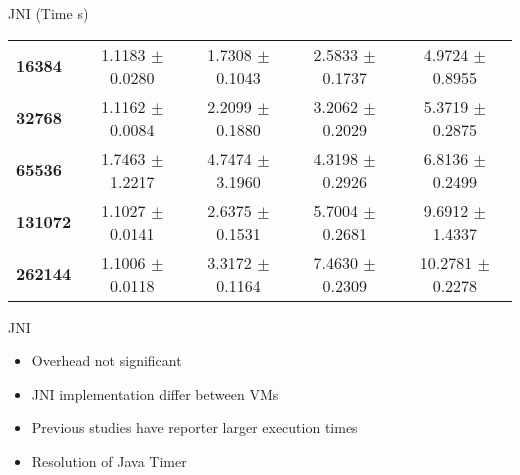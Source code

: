\documentclass[xcolor={table}]{beamer}
\begin{document}
\begin{frame}{JNI (Time \textmu s)}
{\begin{tabular}{lcccc}
            \textbf{16384}  & 1.1183 $\pm$ 0.0280 & 1.7308 $\pm$ 0.1043 & 2.5833 $\pm$ 0.1737 & 4.9724 $\pm$ 0.8955\\
            \textbf{32768}  & 1.1162 $\pm$ 0.0084 & 2.2099 $\pm$ 0.1880 & 3.2062 $\pm$ 0.2029 & 5.3719 $\pm$ 0.2875\\
            \textbf{65536}  & 1.7463 $\pm$ 1.2217 & 4.7474 $\pm$ 3.1960 & 4.3198 $\pm$ 0.2926 & 6.8136 $\pm$ 0.2499\\
            \textbf{131072}  & 1.1027 $\pm$ 0.0141 & 2.6375 $\pm$ 0.1531 & 5.7004 $\pm$ 0.2681 & 9.6912 $\pm$ 1.4337\\
            \textbf{262144} & 1.1006 $\pm$ 0.0118 & 3.3172 $\pm$ 0.1164 & 7.4630 $\pm$ 0.2309 & 10.2781 $\pm$ 0.2278\\
            \bottomrule
        \end{tabular}
    }
\end{frame}

\begin{frame}{JNI}
    \begin{itemize}
        \item Overhead not significant
        \item JNI implementation differ between VMs
        \item Previous studies have reporter larger execution times
        \item Resolution of Java Timer
    \end{itemize}
\end{frame}
\end{document}
